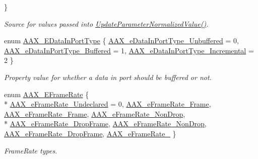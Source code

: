 \begin{DoxyCompactItemize}
 \}
\begin{DoxyCompactList}\small\item\em Source for values passed into \hyperlink{a00061_a685858711efb8634ce66c327f2865c71}{Update\+Parameter\+Normalized\+Value()}. \end{DoxyCompactList}\item 
enum \hyperlink{a00206_ab5677b173ad8647c24d34d28272d11fc}{A\+A\+X\+\_\+\+E\+Data\+In\+Port\+Type} \{ \hyperlink{a00206_ab5677b173ad8647c24d34d28272d11fca43dc59a68b369ee607f70700bfd02c2d}{A\+A\+X\+\_\+e\+Data\+In\+Port\+Type\+\_\+\+Unbuffered} = 0, 
\hyperlink{a00206_ab5677b173ad8647c24d34d28272d11fcaa9f089bb87161125a38706c81ec522e0}{A\+A\+X\+\_\+e\+Data\+In\+Port\+Type\+\_\+\+Buffered} = 1, 
\hyperlink{a00206_ab5677b173ad8647c24d34d28272d11fca4c356b21e878cfafca33ff61e1044b2e}{A\+A\+X\+\_\+e\+Data\+In\+Port\+Type\+\_\+\+Incremental} = 2
 \}
\begin{DoxyCompactList}\small\item\em Property value for whether a data in port should be buffered or not. \end{DoxyCompactList}\item 
enum \hyperlink{a00206_a1271a51553bf508de59864334111aa8f}{A\+A\+X\+\_\+\+E\+Frame\+Rate} \{ \\*
\hyperlink{a00206_a1271a51553bf508de59864334111aa8fa2531bb96f482f75193a33847de41339d}{A\+A\+X\+\_\+e\+Frame\+Rate\+\_\+\+Undeclared} = 0, 
\hyperlink{a00206_a1271a51553bf508de59864334111aa8fae01baa9a691f9dfc1c1722f7e699a0b1}{A\+A\+X\+\_\+e\+Frame\+Rate\+\_\+Frame}, 
\hyperlink{a00206_a1271a51553bf508de59864334111aa8fad1a67aa0eed5e8311682660e76ee0ba0}{A\+A\+X\+\_\+e\+Frame\+Rate\+\_\+Frame}, 
\hyperlink{a00206_a1271a51553bf508de59864334111aa8fa85a4be2351bdb49f5ccf67518da0a9f4}{A\+A\+X\+\_\+e\+Frame\+Rate\+\_\+Non\+Drop}, 
\\*
\hyperlink{a00206_a1271a51553bf508de59864334111aa8fa84ab974603632508561b516eae6eb016}{A\+A\+X\+\_\+e\+Frame\+Rate\+\_\+Drop\+Frame}, 
\hyperlink{a00206_a1271a51553bf508de59864334111aa8fa829aad6d7a7766ff5ec8827107d13e52}{A\+A\+X\+\_\+e\+Frame\+Rate\+\_\+Non\+Drop}, 
\hyperlink{a00206_a1271a51553bf508de59864334111aa8facf8c9beac64946ca738a1a94c6e52151}{A\+A\+X\+\_\+e\+Frame\+Rate\+\_\+Drop\+Frame}, 
\hyperlink{a00206_a1271a51553bf508de59864334111aa8fac21050d46f45b891de39d1dc619cf58e}{A\+A\+X\+\_\+e\+Frame\+Rate\+\_}
 \}
\begin{DoxyCompactList}\small\item\em Frame\+Rate types. \end{DoxyCompactList}\item 

\end{DoxyCompactItemize}
